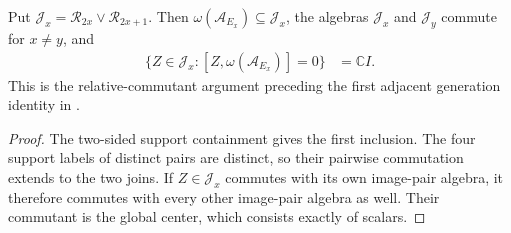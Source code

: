 \begin{lemma}
    \label{lem:qca_adjacent_support_relative_commutant}
    \leanok
    Put $\mathcal J_x=\mathcal R_{2x}\vee\mathcal R_{2x+1}$.
    Then $\omega(\mathcal A_{E_x})\subseteq\mathcal J_x$, the algebras
    $\mathcal J_x$ and $\mathcal J_y$ commute for $x\ne y$, and
    \begin{align}
        \{Z\in\mathcal J_x:[Z,\omega(\mathcal A_{E_x})]=0\}
         & =\mathbb C I.
        \label{eq:qca_adjacent_support_relative_commutant}
    \end{align}
    This is the relative-commutant argument preceding the first adjacent
    generation identity in \cite[lines~1276--1287]{Gross2012IndexTheory}.
\end{lemma}
\begin{proof}\leanok
    The two-sided support containment gives the first inclusion. The four
    support labels of distinct pairs are distinct, so their pairwise
    commutation extends to the two joins. If $Z\in\mathcal J_x$ commutes
    with its own image-pair algebra, it therefore commutes with every other
    image-pair algebra as well. Their commutant is the global center, which
    consists exactly of scalars.
\end{proof}

